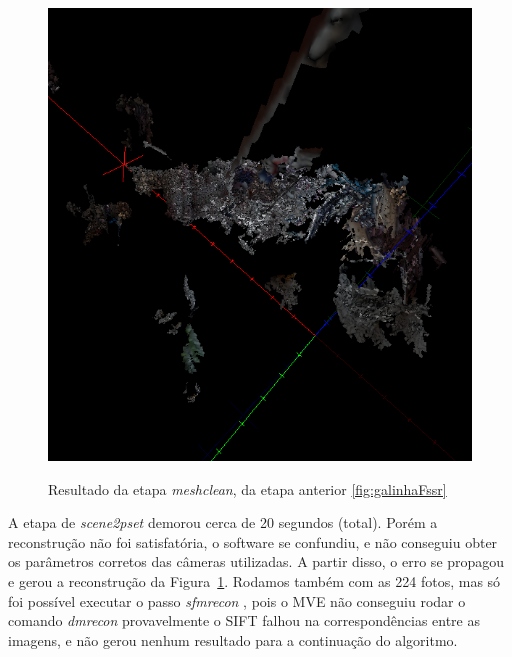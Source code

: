 \begin{figure}[!h]
	\centering
		\caption{%
	Resultado da etapa \emph{meshclean}, da etapa anterior \ref{fig:galinhaFssr}
	}
	\includegraphics[width=0.7\linewidth]{figs/galinhameshclean.png}
		\label{fig:galinhaMeshClean}
\end{figure}

A etapa de \emph{scene2pset} demorou cerca de 20 segundos (total). Porém
a reconstrução não foi satisfatória, o software se confundiu, e
não conseguiu obter os parâmetros corretos das câmeras utilizadas. A partir
disso, o erro se propagou e gerou a reconstrução da Figura~\ref{fig:galinhaMeshClean}.  Rodamos também com as 224 fotos, mas só foi possível
executar o passo \emph{sfmrecon} %
, pois o MVE não
conseguiu rodar o comando \emph{dmrecon} provavelmente o SIFT falhou na correspondências entre as imagens, e não gerou nenhum
resultado para a continuação do algoritmo.%



